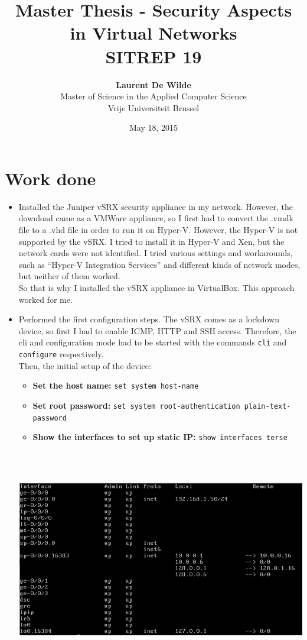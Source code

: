 \documentclass[11pt, a4paper]{article}
\title{Master Thesis -  Security Aspects in Virtual Networks\\ \textbf{SITREP 19}}
\author{\textbf{Laurent De Wilde} \\ Master of Science in the Applied Computer Science \\ Vrije Universiteit Brussel}
\date{May 18, 2015}
\begin{document}
\maketitle


\section*{Work done}
\begin{itemize}
\item Installed the Juniper vSRX security appliance in my network. However, the download came as a VMWare appliance, so I first had to convert the .vmdk file to a .vhd file in order to run it on Hyper-V. However, the Hyper-V is not supported by the vSRX. I tried to install it in Hyper-V and Xen, but the network cards were not identified. I tried various settings and workarounds, such as ``Hyper-V Integration Services'' and different kinds of network modes, but neither of them worked. \\
So that is why I installed the vSRX appliance in VirtualBox. This approach worked for me.
\item Performed the first configuration steps. The vSRX comes as a lockdown device, so first I had to enable ICMP, HTTP and SSH access. Therefore, the cli and configuration mode had to be started with the commands \texttt{cli} and \texttt{configure} respectively. \\
Then, the initial setup of the device:
\begin{itemize}
\item \textbf{Set the host name:} \texttt{set system host-name}
\item \textbf{Set root password:} \texttt{set system root-authentication plain-text-password}
\item \textbf{Show the interfaces to set up static IP:} \texttt{show interfaces terse}
\end{itemize}
$\;$ \\ \\
\noindent\begin{minipage}{\textwidth}
    \centering
    \includegraphics[width=\textwidth]{Juniper_2.png}

\end{minipage}
\end{itemize}
\end{document}
